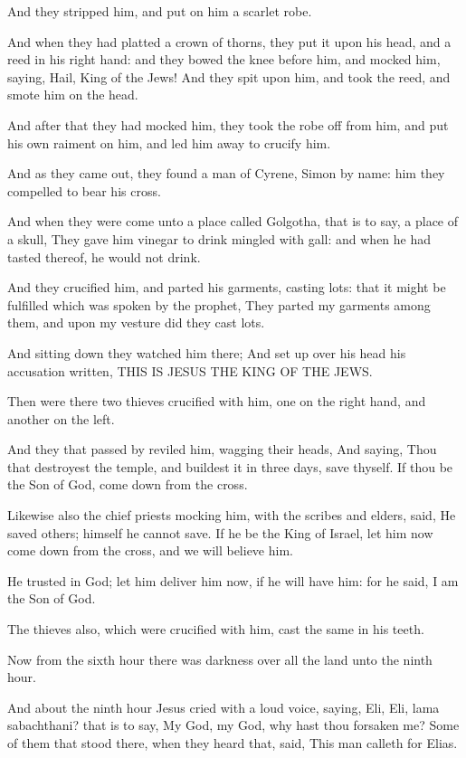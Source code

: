 \Verse And they stripped him, and put on him a scarlet robe.

\Verse And when they had platted a crown of thorns, they put it upon his head, and a reed in his right hand: and they bowed the knee before him, and mocked him, saying, Hail, King of the Jews!  \Verse And they spit upon him, and took the reed, and smote him on the head.

\Verse And after that they had mocked him, they took the robe off from him, and put his own raiment on him, and led him away to crucify him.

\Verse And as they came out, they found a man of Cyrene, Simon by name: him they compelled to bear his cross.

\Verse And when they were come unto a place called Golgotha, that is to say, a place of a skull, \Verse They gave him vinegar to drink mingled with gall: and when he had tasted thereof, he would not drink.

\Verse And they crucified him, and parted his garments, casting lots: that it might be fulfilled which was spoken by the prophet, They parted my garments among them, and upon my vesture did they cast lots.

\Verse And sitting down they watched him there; \Verse And set up over his head his accusation written, THIS IS JESUS THE KING OF THE JEWS.

\Verse Then were there two thieves crucified with him, one on the right hand, and another on the left.

\Verse And they that passed by reviled him, wagging their heads, \Verse And saying, Thou that destroyest the temple, and buildest it in three days, save thyself. If thou be the Son of God, come down from the cross.

\Verse Likewise also the chief priests mocking him, with the scribes and elders, said, \Verse He saved others; himself he cannot save. If he be the King of Israel, let him now come down from the cross, and we will believe him.

\Verse He trusted in God; let him deliver him now, if he will have him: for he said, I am the Son of God.

\Verse The thieves also, which were crucified with him, cast the same in his teeth.

\Verse Now from the sixth hour there was darkness over all the land unto the ninth hour.

\Verse And about the ninth hour Jesus cried with a loud voice, saying, Eli, Eli, lama sabachthani? that is to say, My God, my God, why hast thou forsaken me?  \Verse Some of them that stood there, when they heard that, said, This man calleth for Elias.

